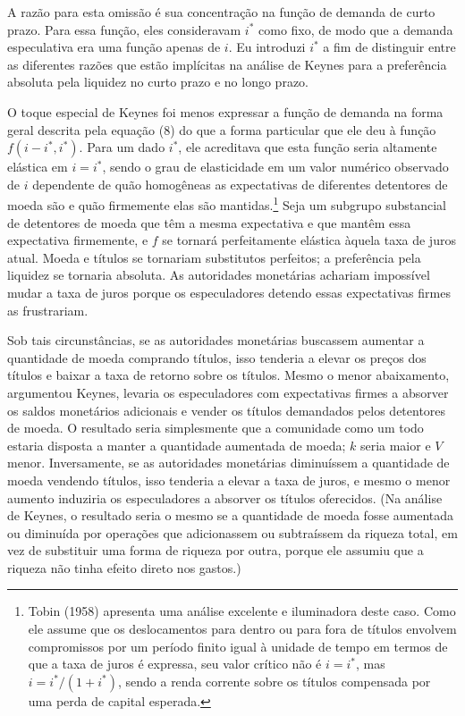 \documentclass[12pt]{article}
\begin{document}
A razão para esta omissão é sua concentração na função de demanda de curto prazo. Para essa função, eles consideravam $i^*$ como fixo, de modo que a demanda especulativa era uma função apenas de $i$. Eu introduzi $i^*$ a fim de distinguir entre as diferentes razões que estão implícitas na análise de Keynes para a preferência absoluta pela liquidez no curto prazo e no longo prazo.

O toque especial de Keynes foi menos expressar a função de demanda na forma geral descrita pela equação (8) do que a forma particular que ele deu à função $f(i - i^*, i^*)$. Para um dado $i^*$, ele acreditava que esta função seria altamente elástica em $i = i^*$, sendo o grau de elasticidade em um valor numérico observado de $i$ dependente de quão homogêneas as expectativas de diferentes detentores de moeda são e quão firmemente elas são mantidas.\footnote{Tobin (1958) apresenta uma análise excelente e iluminadora deste caso. Como ele assume que os deslocamentos para dentro ou para fora de títulos envolvem compromissos por um período finito igual à unidade de tempo em termos de que a taxa de juros é expressa, seu valor crítico não é $i = i^*$, mas $i = i^*/(1 + i^*)$, sendo a renda corrente sobre os títulos compensada por uma perda de capital esperada.} Seja um subgrupo substancial de detentores de moeda que têm a mesma expectativa e que mantêm essa expectativa firmemente, e $f$ se tornará perfeitamente elástica àquela taxa de juros atual. Moeda e títulos se tornariam substitutos perfeitos; a preferência pela liquidez se tornaria absoluta. As autoridades monetárias achariam impossível mudar a taxa de juros porque os especuladores detendo essas expectativas firmes as frustrariam.

Sob tais circunstâncias, se as autoridades monetárias buscassem aumentar a quantidade de moeda comprando títulos, isso tenderia a elevar os preços dos títulos e baixar a taxa de retorno sobre os títulos. Mesmo o menor abaixamento, argumentou Keynes, levaria os especuladores com expectativas firmes a absorver os saldos monetários adicionais e vender os títulos demandados pelos detentores de moeda. O resultado seria simplesmente que a comunidade como um todo estaria disposta a manter a quantidade aumentada de moeda; $k$ seria maior e $V$ menor. Inversamente, se as autoridades monetárias diminuíssem a quantidade de moeda vendendo títulos, isso tenderia a elevar a taxa de juros, e mesmo o menor aumento induziria os especuladores a absorver os títulos oferecidos. (Na análise de Keynes, o resultado seria o mesmo se a quantidade de moeda fosse aumentada ou diminuída por operações que adicionassem ou subtraíssem da riqueza total, em vez de substituir uma forma de riqueza por outra, porque ele assumiu que a riqueza não tinha efeito direto nos gastos.)
\end{document}
